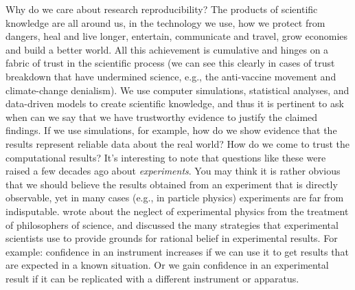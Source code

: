 \documentclass{statement}
\begin{document}
Why do we care about research reproducibility? 
The products of scientific knowledge are all around us, in the technology we use, how we protect from dangers, heal and live longer, entertain, communicate and travel, grow economies and build a better world. 
All this achievement is cumulative and hinges on a fabric of trust in the scientific process (we can see this clearly in cases of trust breakdown that have undermined science, e.g., the anti-vaccine movement and climate-change denialism). 
We use computer simulations, statistical analyses, and data-driven models to create scientific knowledge, and thus it is pertinent to ask when can we say that we have trustworthy evidence to justify the claimed findings. 
If we use simulations, for example, how do we show evidence that the results represent reliable data about the real world? 
How do we come to trust the computational results? 
It's interesting to note that questions like these were raised a few decades ago about \emph{experiments}. 
You may think it is rather obvious that we should believe the results obtained from an experiment that is directly observable, yet in many cases (e.g., in particle physics) experiments are far from indisputable. 
\cite{franklin1989} wrote about the neglect of experimental physics from the treatment of philosophers of science, and discussed the many strategies that experimental scientists use to provide grounds for rational belief in experimental results. 
For example: confidence in an instrument increases if we can use it to get results that are expected in a known situation. 
Or we gain confidence in an experimental result if it can be replicated with a different instrument or apparatus. 
\end{document}
